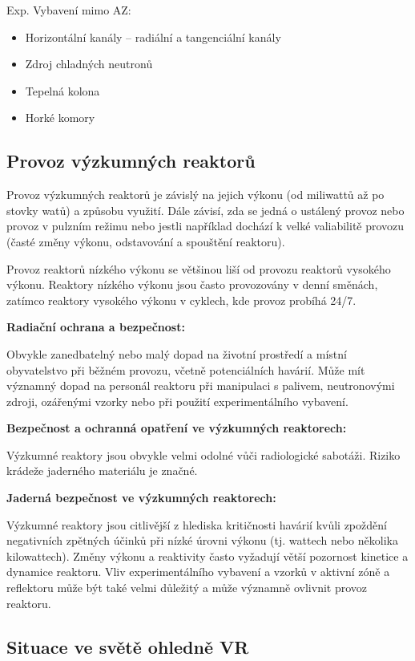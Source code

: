 Exp. Vybavení mimo AZ:

\begin{itemize}
    \item Horizontální kanály -- radiální a tangenciální kanály
    \item Zdroj chladných neutronů
    \item Tepelná kolona
    \item Horké komory
\end{itemize}

\subsection{Provoz výzkumných reaktorů}

Provoz výzkumných reaktorů je závislý na jejich výkonu (od miliwattů až po stovky watů) a způsobu využití. Dále závisí, zda se jedná o ustálený provoz nebo provoz v pulzním režimu nebo jestli například dochází k velké valiabilitě provozu (časté změny výkonu, odstavování a spouštění reaktoru). 

Provoz reaktorů nízkého výkonu se většinou liší od provozu reaktorů vysokého výkonu. Reaktory nízkého výkonu jsou často provozovány v denní směnách, zatímco reaktory vysokého výkonu v cyklech, kde provoz probíhá 24/7.

\textbf{Radiační ochrana a bezpečnost:}

Obvykle zanedbatelný nebo malý dopad na životní prostředí a místní obyvatelstvo při běžném provozu, včetně potenciálních havárií. Může mít významný dopad na personál reaktoru při manipulaci s palivem, neutronovými zdroji, ozářenými vzorky nebo při použití experimentálního vybavení.

\textbf{Bezpečnost a ochranná opatření ve výzkumných reaktorech:}

Výzkumné reaktory jsou obvykle velmi odolné vůči radiologické sabotáži. Riziko krádeže jaderného materiálu je značné.
 
\textbf{Jaderná bezpečnost ve výzkumných reaktorech:}

Výzkumné reaktory jsou citlivější z hlediska kritičnosti havárií kvůli zpoždění negativních zpětných účinků při nízké úrovni výkonu (tj. wattech nebo několika kilowattech). Změny výkonu a reaktivity často vyžadují větší pozornost kinetice a dynamice reaktoru. Vliv experimentálního vybavení a vzorků v aktivní zóně a reflektoru může být také velmi důležitý a může významně ovlivnit provoz reaktoru. 

\subsection{Situace ve světě ohledně VR}

